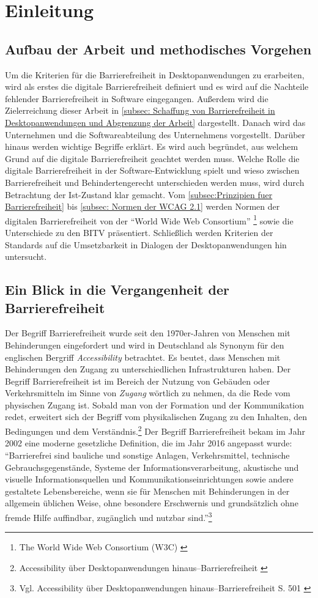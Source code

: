 \section{Einleitung}

\subsection{Aufbau der Arbeit und methodisches Vorgehen}
Um die Kriterien für die Barrierefreiheit in Desktopanwendungen zu erarbeiten, wird als erstes die digitale Barrierefreiheit definiert und es wird auf die Nachteile fehlender Barrierefreiheit in Software eingegangen. Außerdem wird die Zielerreichung dieser Arbeit in \cref{subsec: Schaffung von Barrierefreiheit in Desktopanwendungen und Abgrenzung der Arbeit} dargestellt. Danach wird das Unternehmen und die Softwareabteilung des Unternehmens vorgestellt. Darüber hinaus werden wichtige Begriffe erklärt. Es wird auch begründet, aus welchem Grund auf die digitale Barrierefreiheit geachtet werden muss. Welche Rolle die digitale Barrierefreiheit in der Software-Entwicklung spielt und wieso zwischen Barrierefreiheit und Behindertengerecht unterschieden werden muss, wird durch Betrachtung der Ist-Zustand klar gemacht. Vom \cref{subsec:Prinzipien fuer Barrierefreiheit} bis \cref{subsec: Normen der WCAG 2.1} werden Normen der digitalen Barrierefreiheit von der "`World Wide Web Consortium"' \footnote{The World Wide Web Consortium (W3C) \cite{w3c}} sowie die Unterschiede zu den \ac{BITV} präsentiert. Schließlich werden Kriterien der Standards auf die Umsetzbarkeit in Dialogen der Desktopanwendungen hin untersucht.

\subsection{Ein Blick in die Vergangenheit der Barrierefreiheit}
Der Begriff Barrierefreiheit wurde seit den 1970er-Jahren von Menschen mit Behinderungen eingefordert und wird in Deutschland als Synonym für den englischen Bergriff \textit{Accessibility} betrachtet. Es beutet, dass Menschen mit Behinderungen den Zugang zu unterschiedlichen Infrastrukturen haben. Der Begriff Barrierefreiheit ist im Bereich der Nutzung von Gebäuden oder Verkehrsmitteln im Sinne von \textit{Zugang} wörtlich zu nehmen, da die Rede vom physischen Zugang ist. Sobald man von der Formation und der Kommunikation redet, erweitert sich der Begriff vom physikalischen Zugang zu den Inhalten, den Bedingungen und dem Verständnis.\footnote{Accessibility über Desktopanwendungen hinaus–Barrierefreiheit \cite{buhler2017accessibility}} Der Begriff Barrierefreiheit bekam im Jahr 2002 eine moderne gesetzliche Definition, die im Jahr 2016 angepasst wurde: "`Barrierefrei sind bauliche und sonstige Anlagen, Verkehrsmittel, technische Gebrauchsgegenstände, Systeme der Informationsverarbeitung, akustische und visuelle Informationsquellen und Kommunikationseinrichtungen sowie andere gestaltete Lebensbereiche, wenn sie für Menschen mit Behinderungen in der allgemein üblichen Weise, ohne besondere Erschwernis und grundsätzlich ohne fremde Hilfe auffindbar, zugänglich und nutzbar sind."'\footnote{Vgl. Accessibility über Desktopanwendungen hinaus–Barrierefreiheit S. 501 \cite{buhler2017accessibility}}

